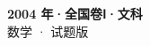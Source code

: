 \documentclass[zihao=-4, a4paper]{ctexart}
\begin{document}
\begin{center}
  {\Large\bfseries 2004 年·全国卷Ⅰ·文科}\\[4pt]
  {\large 数学 · 试题版}
\end{center}
\medskip
{}

\end{document}
